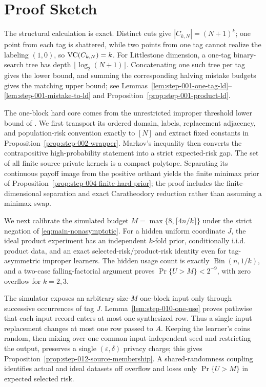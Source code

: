 \section{Proof Sketch}\label{sec:roadmap}

The structural calculation is exact.  Distinct cuts give
$|C_{k,N}|=(N+1)^k$; one point from each tag is shattered, while two points
from one tag cannot realize the labeling $(1,0)$, so $\operatorname{VC}(C_{k,N})=k$.
For Littlestone dimension, a one-tag binary-search tree has depth
$\lfloor\log_2(N+1)\rfloor$.  Concatenating one such tree per tag gives the
lower bound, and summing the corresponding halving mistake budgets gives the
matching upper bound; see Lemmas~\ref{lem:step-001-one-tag-ld}--
\ref{lem:step-001-mistake-to-ld} and
Proposition~\ref{prop:step-001-product-ld}.

The one-block hard core comes from the unrestricted improper threshold lower
bound of \citet{AlonLivniMalliarisMoran2019}.  We first transport its ordered
domain, labels, replacement adjacency, and population-risk convention exactly
to $[N]$ and extract fixed constants in
Proposition~\ref{prop:step-002-wrapper}.  Markov's inequality then converts
the contrapositive high-probability statement into a strict expected-risk
gap.  The set of all finite source-private kernels is a compact polytope.
Separating its continuous payoff image from the positive orthant yields the
finite minimax prior of
Proposition~\ref{prop:step-004-finite-hard-prior}; the proof includes the
finite-dimensional separation and exact Caratheodory reduction rather than
assuming a minimax swap.

We next calibrate the simulated budget
$M=\max\{8,\lceil4n/k\rceil\}$ under the strict negation of
\eqref{eq:main-nonasymptotic}.  For a hidden uniform coordinate $J$, the
ideal product experiment has an independent $k$-fold prior, conditionally
i.i.d. product data, and an exact selected-risk/product-risk identity even
for tag-asymmetric improper learners.  The hidden usage count is exactly
$\operatorname{Bin}(n,1/k)$, and a two-case falling-factorial argument proves
$\Pr\{U>M\}<2^{-9}$, with zero overflow for $k=2,3$.

The simulator exposes an arbitrary size-$M$ one-block input only through
successive occurrences of tag $J$.  Lemma~\ref{lem:step-010-one-use} proves
pathwise that each input record enters at most one synthesized row.  Thus a
single input replacement changes at most one row passed to $A$.  Keeping the
learner's coins random, then mixing over one common input-independent seed and
restricting the output, preserves a single $(\varepsilon,\delta)$ privacy
charge; this gives Proposition~\ref{prop:step-012-source-membership}.  A
shared-randomness coupling identifies actual and ideal datasets off overflow
and loses only $\Pr\{U>M\}$ in expected selected risk.

